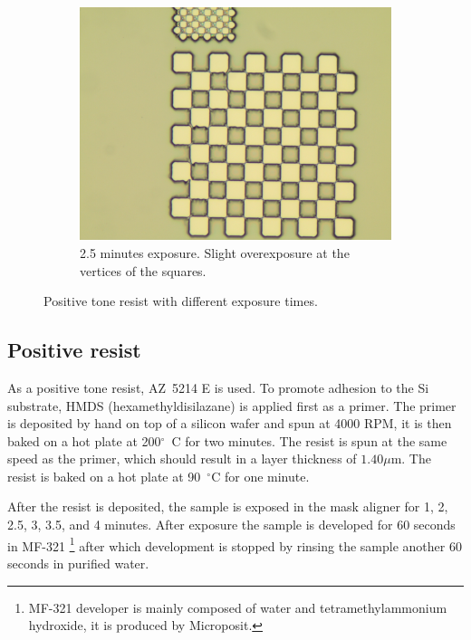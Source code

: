 \begin{figure}[!b]
\begin{subfigure}[t]{0.3\linewidth}
    \end{subfigure}
    \hfill
    \begin{subfigure}[t]{0.3\linewidth}
        \centering
        \includegraphics[width=\textwidth]{data/b3e1.jpg}
        \caption{2.5 minutes exposure. Slight overexposure at the vertices of the squares.}
        \label{fig:b3e1}
    \end{subfigure}
    \hfill
    \caption{Positive tone resist with different exposure times.}
\end{figure}

\subsection*{Positive resist}
As a positive tone resist, AZ~5214 E is used. To promote adhesion to the Si substrate, HMDS (hexamethyldisilazane) is applied first as a primer. The primer is deposited by hand on top of a silicon wafer and spun at 4000 RPM, it is then baked on a hot plate at 200$^{\circ}$~C for two minutes. The resist is spun at the same speed as the primer, which should result in a layer thickness of $1.40 \mu$m. The resist is baked on a hot plate at 90~$^{\circ}$C for one minute.

After the resist is deposited, the sample is exposed in the mask aligner for 1, 2, 2.5, 3, 3.5, and 4 minutes. After exposure the sample is developed for 60 seconds in MF-321 \footnote{MF-321 developer is mainly composed of water and tetramethylammonium hydroxide, it is produced by Microposit.} after which development is stopped by rinsing the sample another 60 seconds in purified water.


